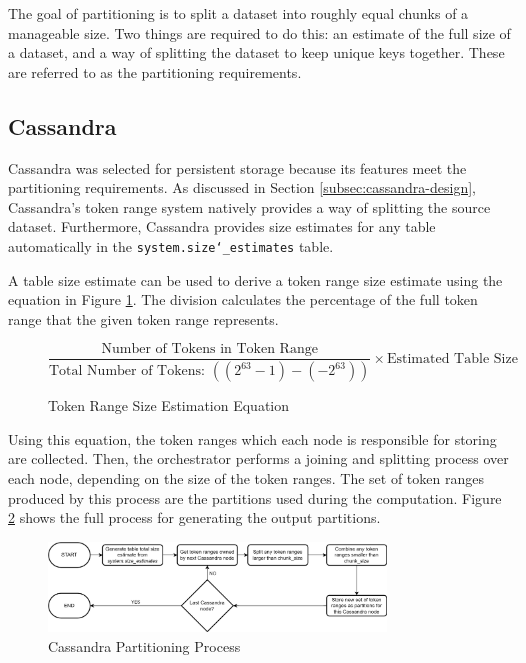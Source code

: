 The goal of partitioning is to split a dataset into roughly equal chunks of a manageable size. Two things are required to do this: an estimate of the full size of a dataset, and a way of splitting the dataset to keep unique keys together. These are referred to as the partitioning requirements.

\subsection{Cassandra}\label{subsec:cassandra}
Cassandra was selected for persistent storage because its features meet the partitioning requirements. As discussed in Section \ref{subsec:cassandra-design}, Cassandra's token range system natively provides a way of splitting the source dataset. Furthermore, Cassandra provides size estimates for any table automatically in the \texttt{system.size\char`_estimates} table.


A table size estimate can be used to derive a token range size estimate using the equation in Figure \ref{fig:token-range-estimation}. The division calculates the percentage of the full token range that the given token range represents.

\begin{figure}[h]
	\centering
	\[ \frac{\text{Number of Tokens in Token Range}}{\text{Total Number of Tokens: } ((2^{63}-1) - (-2^{63}))} \times \text{Estimated Table Size} \]
	\caption{Token Range Size Estimation Equation}
	\label{fig:token-range-estimation}
\end{figure}

\pagebreak
Using this equation, the token ranges which each node is responsible for storing are collected. Then, the orchestrator performs a joining and splitting process over each node, depending on the size of the token ranges. The set of token ranges produced by this process are the partitions used during the computation. Figure \ref{fig:cassandra-partitioning-decision-tree} shows the full process for generating the output partitions.

\begin{figure}[h]
	\centering
	\includegraphics[width=0.8\textwidth]{chapters/diagrams/implementation/cassandra-partitioning-decision-tree}
	\caption{Cassandra Partitioning Process}
	\label{fig:cassandra-partitioning-decision-tree}
\end{figure}


